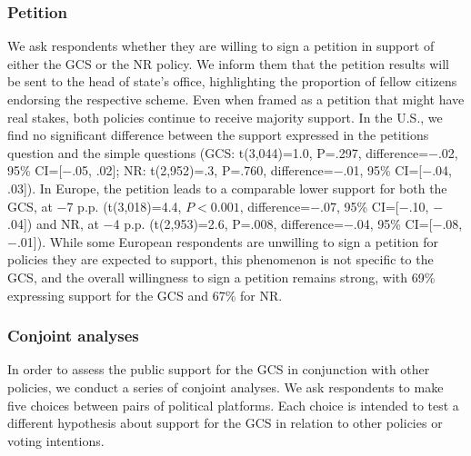 \subsubsection{Petition}\label{subsubsec:petition} %

We ask respondents whether they are willing to sign a petition in support of either the GCS or the NR policy. We inform them that the petition results will be sent to the head of state's office, highlighting the proportion of fellow citizens endorsing the respective scheme. Even when framed as a petition that might have real stakes, both policies continue to receive majority support. In the U.S., we find no significant difference between the support expressed in the %
petitions question and the simple questions (GCS: t(3,044)=1.0, P=.297, difference=$-$.02, 95\% CI=[$-$.05, .02]; NR: t(2,952)=.3, P=.760, difference=$-$.01, 95\% CI=[$-$.04, .03]). 
In Europe, the petition leads to a comparable lower support for both the GCS, at $-$7 p.p. (t(3,018)=4.4, $P<0.001$, difference=$-$.07, 95\% CI=[$-$.10, $-$.04]) and NR, at $-$4 p.p. (t(2,953)=2.6, P=.008, difference=$-$.04, 95\% CI=[$-$.08, $-$.01]). 
While some European respondents are unwilling to sign a petition for policies they are expected to support, this phenomenon is not specific to the GCS, and the overall willingness to sign a %
petition remains strong, with 69\% expressing support for the GCS and 67\% for NR.

\subsubsection{Conjoint analyses}\label{subsubsec:conjoint} %

In order to assess the public support for the GCS in conjunction with other policies, we conduct a series of conjoint analyses. We ask respondents to make five choices between pairs of political platforms. Each choice is intended to test a different hypothesis about support for the GCS in relation to other policies or voting intentions.

